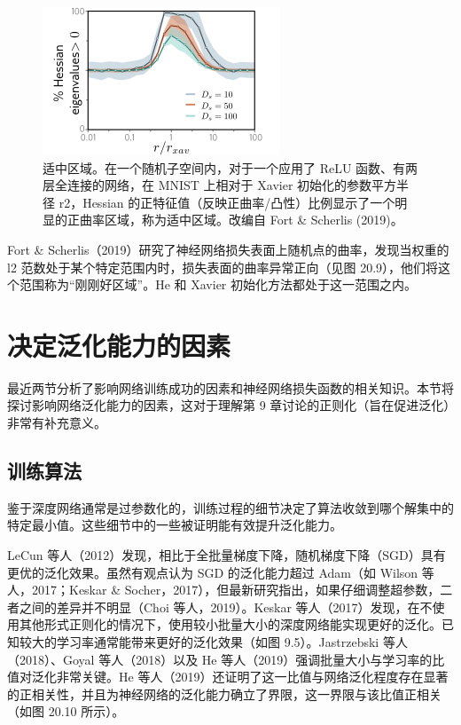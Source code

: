 \begin{figure}[ht!]
\centering
\includegraphics[width=0.7\linewidth]{png/chapter20/WhyGoldilocks.png}
\caption{适中区域。在一个随机子空间内，对于一个应用了 ReLU 函数、有两层全连接的网络，在 MNIST 上相对于 Xavier 初始化的参数平方半径 r2，Hessian 的正特征值（反映正曲率/凸性）比例显示了一个明显的正曲率区域，称为适中区域。改编自 Fort \& Scherlis (2019)。}
\end{figure}

Fort \& Scherlis（2019）研究了神经网络损失表面上随机点的曲率，发现当权重的 l2 范数处于某个特定范围内时，损失表面的曲率异常正向（见图 20.9），他们将这个范围称为“刚刚好区域”。He 和 Xavier 初始化方法都处于这一范围之内。

\section{决定泛化能力的因素}
最近两节分析了影响网络训练成功的因素和神经网络损失函数的相关知识。本节将探讨影响网络泛化能力的因素，这对于理解第 9 章讨论的正则化（旨在促进泛化）非常有补充意义。

\subsection{训练算法}
鉴于深度网络通常是过参数化的，训练过程的细节决定了算法收敛到哪个解集中的特定最小值。这些细节中的一些被证明能有效提升泛化能力。

LeCun 等人（2012）发现，相比于全批量梯度下降，随机梯度下降（SGD）具有更优的泛化效果。虽然有观点认为 SGD 的泛化能力超过 Adam（如 Wilson 等人，2017；Keskar \& Socher，2017），但最新研究指出，如果仔细调整超参数，二者之间的差异并不明显（Choi 等人，2019）。Keskar 等人（2017）发现，在不使用其他形式正则化的情况下，使用较小批量大小的深度网络能实现更好的泛化。已知较大的学习率通常能带来更好的泛化效果（如图 9.5）。Jastrzebski 等人（2018）、Goyal 等人（2018）以及 He 等人（2019）强调批量大小与学习率的比值对泛化非常关键。He 等人（2019）还证明了这一比值与网络泛化程度存在显著的正相关性，并且为神经网络的泛化能力确立了界限，这一界限与该比值正相关（如图 20.10 所示）。

